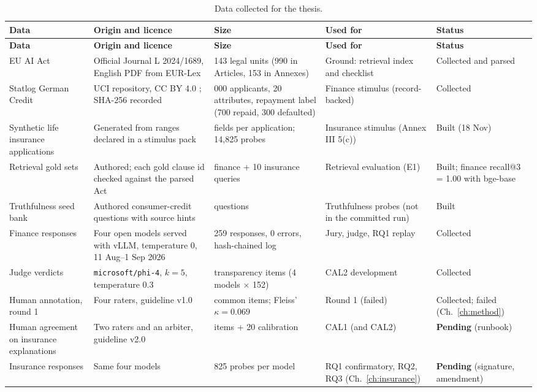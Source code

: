 \par\vspace{1em}
{\scriptsize
\setlength{\tabcolsep}{3pt}\setlength{\LTpre}{2.5em}\setlength{\LTpost}{1em}
\renewcommand{\arraystretch}{1.15}
\begin{longtable}{@{}>{\raggedright\arraybackslash}p{2.9cm}>{\raggedright\arraybackslash}p{3.3cm}>{\raggedright\arraybackslash}p{2.9cm}>{\raggedright\arraybackslash}p{3.1cm}>{\raggedright\arraybackslash}p{2.3cm}@{}}
\caption{Data collected for the thesis.}\label{tab:datasets}\\
\toprule
\textbf{Data} & \textbf{Origin and licence} & \textbf{Size} & \textbf{Used for} & \textbf{Status} \\
\midrule
\endfirsthead
\toprule
\textbf{Data} & \textbf{Origin and licence} & \textbf{Size} & \textbf{Used for} & \textbf{Status} \\
\midrule
\endhead
\bottomrule
\endlastfoot
EU AI Act & Official Journal L 2024/1689, English PDF from EUR-Lex \citep{euaiact2024} & 1{,}143 legal units (990 in Articles, 153 in Annexes) & Ground: retrieval index and checklist & Collected and parsed \\
Statlog German Credit & UCI repository, CC BY 4.0 \citep{statlog}; SHA-256 recorded & 1{,}000 applicants, 20 attributes, repayment label (700 repaid, 300 defaulted) & Finance stimulus (record-backed) & Collected \\
Synthetic life insurance applications & Generated from ranges declared in a stimulus pack & 12 fields per application; 14{,}825 probes & Insurance stimulus (Annex III 5(c)) & Built (18 Nov) \\
Retrieval gold sets & Authored; each gold clause id checked against the parsed Act & 10 finance + 10 insurance queries & Retrieval evaluation (E1) & Built; finance recall@3 = 1.00 with bge-base \\
Truthfulness seed bank & Authored consumer-credit questions with source hints & 20 questions & Truthfulness probes (not in the committed run) & Built \\
Finance responses & Four open models served with vLLM, temperature 0, 11 Aug--1 Sep 2026 & 61{,}259 responses, 0 errors, hash-chained log & Jury, judge, RQ1 replay & Collected \\
Judge verdicts & \texttt{microsoft/phi-4}, $k=5$, temperature 0.3 & 608 transparency items (4 models $\times$ 152) & CAL2 development & Collected \\
Human annotation, round 1 & Four raters, guideline v1.0 & 30 common items; Fleiss' $\kappa = 0.069$ & Round 1 (failed) & Collected; failed (Ch.~\ref{ch:method}) \\
Human agreement on insurance explanations & Two raters and an arbiter, guideline v2.0 & 240 items + 20 calibration & CAL1 (and CAL2) & \textbf{Pending} (runbook) \\
Insurance responses & Same four models & 14{,}825 probes per model & RQ1 confirmatory, RQ2, RQ3 (Ch.~\ref{ch:insurance}) & \textbf{Pending} (signature, amendment) \\
\end{longtable}
}

